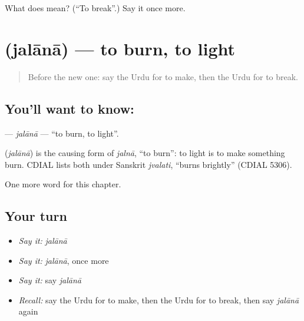 \begin{tcolorbox}[breakable,colback=teal!4,colframe=teal!35!black,title={Before you move on}]
What does  mean? (\textquotedblleft{}To break\textquotedblright{}.) Say it once more.
\end{tcolorbox}
\section[\texorpdfstring{\ur{جلانا} (jalānā)}{جلانا (jalānā)}]{ (jalānā) — to burn, to light}

\label{lesson:UR-C139-jalana}



\begin{quote}
Before the new one: say the Urdu for to make, then the Urdu for to break.
\end{quote}

\subsection*{You'll want to know: }
\textbf{} — \emph{jalānā} — \textquotedblleft{}to burn, to light\textquotedblright{}.

\begin{cousinweb}
\textbf{} (\emph{jalānā}) is the causing form of \emph{jalnā}, \textquotedblleft{}to burn\textquotedblright{}: to light is to make something burn. CDIAL lists both under Sanskrit \emph{jvalati}, \textquotedblleft{}burns brightly\textquotedblright{} (CDIAL 5306).
\end{cousinweb}

\begin{grammarlens}[title={What you've built}]
One more word for this chapter.
\end{grammarlens}

\subsection*{Your turn}
\begin{itemize}
\raggedright
  \item \emph{Say it:} \emph{jalānā}
  \item \emph{Say it:} \emph{jalānā}, once more
  \item \emph{Say it:} say \emph{jalānā}
  \item \emph{Recall:} say the Urdu for to make, then the Urdu for to break, then say \emph{jalānā} again
\end{itemize}

